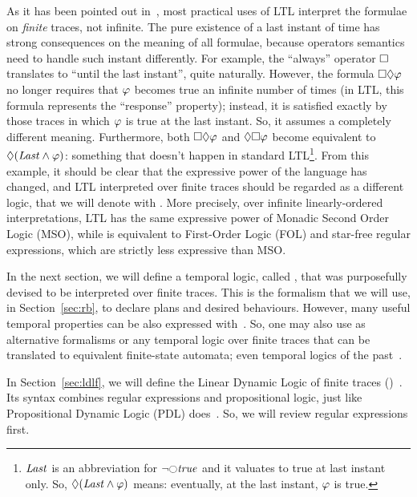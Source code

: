 As it has been pointed out in~\cite{bib:ltlf-ldlf}, most practical uses of LTL
interpret the formulae on \emph{finite} traces, not infinite. The pure
existence of a last instant of time has strong consequences on the meaning of
all formulae, because operators semantics need to handle such instant
differently.  For example, the ``always'' operator $\square$ translates to
``until the last instant'', quite naturally. However, the formula
$\square\lozenge \varphi$ no longer requires that $\varphi$ becomes true
an infinite number of times (in LTL, this formula represents the ``response''
property); instead, it is satisfied exactly by those traces in which
$\varphi$ is true at the last instant. So, it assumes a completely different
meaning.  Furthermore, both $\square\lozenge \varphi$ and
$\lozenge\square \varphi$ become equivalent to $\lozenge (\text{\textit{Last}}
\land \varphi)$: something that doesn't happen in standard LTL\footnote{
	$\text{\textit{Last}}$ is an abbreviation for $\lnot \lnext \true$ and it valuates
	to true at last instant only. So, $\lozenge (\text{\textit{Last}} \land
	\varphi)$ means: eventually, at the last instant, $\varphi$ is true.}.
From this example, it should be clear that the expressive power of the
language has changed, and LTL interpreted over finite traces should be
regarded as a different logic, that we will denote with
\ltl{}.
More precisely, over infinite linearly-ordered interpretations, LTL has the
same expressive power of Monadic Second Order Logic
(MSO), while \ltl{} is
equivalent to First-Order Logic (FOL) and
star-free regular expressions, which are strictly less expressive than MSO.

In the next section, we will define a temporal logic, called \ldl{}, that was
purposefully devised to be interpreted over finite traces. This is the
formalism that we will use, in Section~\ref{sec:rb}, to declare plans and
desired behaviours. However, many useful temporal properties can be also
expressed with~\ltl{}. So, one may also use as alternative formalisms \ltl{}
or any temporal logic over finite traces that can be translated to equivalent
finite-state automata; even temporal logics of the
past~\cite{bib:nmrdp-logic-first}.

In Section~\ref{sec:ldlf}, we will define the Linear Dynamic Logic of finite
traces (\ldl{})~\cite{bib:ltlf-ldlf}. Its syntax combines regular expressions
and propositional logic, just like Propositional Dynamic Logic
(PDL)
does~\cite{bib:pdl}\cite{bib:pdl-stanford}. So, we will review regular
expressions first.



